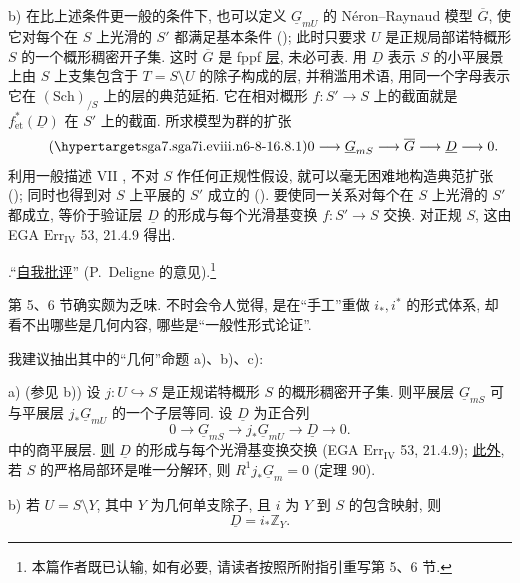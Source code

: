 \smallskip
\noindent b) 在比上述条件更一般的条件下, 也可以定义 $\underline G_{mU}$ 的 N\'eron--Raynaud 模型 $\overline G$, 使它对每个在 $S$ 上光滑的 $S'$ 都满足基本条件 (); 此时只要求 $U$ 是正规局部诺特概形 $S$ 的一个概形稠密开子集. 这时 $\overline G$ 是 fppf \underline{层}, 未必可表. 用 $\underline D$ 表示 $S$ 的小平展景上由 $S$ 上支集包含于 $T=S\setminus U$ 的除子构成的层, 并稍滥用术语, 用同一个字母表示它在 $(\mathrm{Sch})_{/S}$ 上的层的典范延拓. 它在相对概形 $f:S'\to S$ 上的截面就是 $f_{\mathrm{\acute{e}t}}^*(\underline D)$ 在 $S'$ 上的截面. 所求模型为群的扩张
\begin{equation}\tag{\SGARefTarget{sga7.sga7i.eviii.n6-8-1}{6.8.1}}
 0\longrightarrow\underline G_{mS}\longrightarrow\overline G
 \longrightarrow\underline D\longrightarrow0.
\end{equation}
利用一般描述 VII , 不对 $S$ 作任何正规性假设, 就可以毫无困难地构造典范扩张 (); 同时也得到对 $S$ 上平展的 $S'$ 成立的 (). 要使同一关系对每个在 $S$ 上光滑的 $S'$ 都成立, 等价于验证层 $\underline D$ 的形成与每个光滑基变换 $f:S'\to S$ 交换. 对正规 $S$, 这由 EGA $\mathrm{Err}_{\mathrm{IV}}$ 53, 21.4.9 得出.

\medskip
\noindent {}.\quad “\underline{自我批评}” (P.~Deligne 的意见).\footnote{本篇作者既已认输, 如有必要, 请读者按照所附指引重写第 5、6 节.}

第 5、6 节确实颇为乏味. 不时会令人觉得, 是在“手工”重做 $i_*,i^*$ 的形式体系, 却看不出哪些是几何内容, 哪些是“一般性形式论证”.

我建议抽出其中的“几何”命题 a)、b)、c):

\smallskip
\noindent a) (参见  b)) 设 $j:U\hookrightarrow S$ 是正规诺特概形 $S$ 的概形稠密开子集. 则平展层 $\underline G_{mS}$ 可与平展层 $j_*\underline G_{mU}$ 的一个子层等同. 设 $\underline D$ 为正合列
\[
 0\longrightarrow\underline G_{mS}\longrightarrow
 j_*\underline G_{mU}\longrightarrow\underline D\longrightarrow0.
\]
中的商平展层. \underline{则} $\underline D$ 的形成与每个光滑基变换交换 (EGA $\mathrm{Err}_{\mathrm{IV}}$ 53, 21.4.9); \underline{此外}, 若 $S$ 的严格局部环是唯一分解环, 则 $R^1j_*\underline G_m=0$ (定理 90).

\smallskip
\noindent b) 若 $U=S\setminus Y$, 其中 $Y$ 为几何单支除子, 且 $i$ 为 $Y$ 到 $S$ 的包含映射, 则
\[
 \underline D=i_*\mathbb Z_Y.
\]

